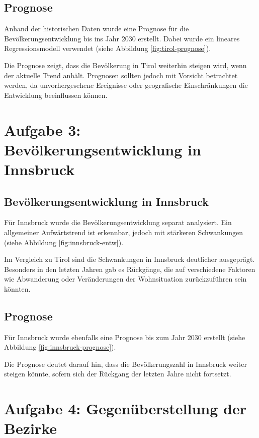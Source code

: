 \documentclass[a4paper,12pt]{article}
\begin{document}
\subsection{Prognose}

Anhand der historischen Daten wurde eine Prognose für die Bevölkerungsentwicklung bis ins Jahr 2030 erstellt. Dabei wurde ein lineares Regressionsmodell verwendet (siehe Abbildung \ref{fig:tirol-prognose}).

Die Prognose zeigt, dass die Bevölkerung in Tirol weiterhin steigen wird, wenn der aktuelle Trend anhält. Prognosen sollten jedoch mit Vorsicht betrachtet werden, da unvorhergesehene Ereignisse oder geografische Einschränkungen die Entwicklung beeinflussen können.

\section{Aufgabe 3: Bevölkerungsentwicklung in Innsbruck}

\subsection{Bevölkerungsentwicklung in Innsbruck}

Für Innsbruck wurde die Bevölkerungsentwicklung separat analysiert. Ein allgemeiner Aufwärtstrend ist erkennbar, jedoch mit stärkeren Schwankungen (siehe Abbildung \ref{fig:innsbruck-entw}).

Im Vergleich zu Tirol sind die Schwankungen in Innsbruck deutlicher ausgeprägt. Besonders in den letzten Jahren gab es Rückgänge, die auf verschiedene Faktoren wie Abwanderung oder Veränderungen der Wohnsituation zurückzuführen sein könnten.

\subsection{Prognose}

Für Innsbruck wurde ebenfalls eine Prognose bis zum Jahr 2030 erstellt (siehe Abbildung \ref{fig:innsbruck-prognose}).

Die Prognose deutet darauf hin, dass die Bevölkerungszahl in Innsbruck weiter steigen könnte, sofern sich der Rückgang der letzten Jahre nicht fortsetzt.

\section{Aufgabe 4: Gegenüberstellung der Bezirke}
\end{document}
